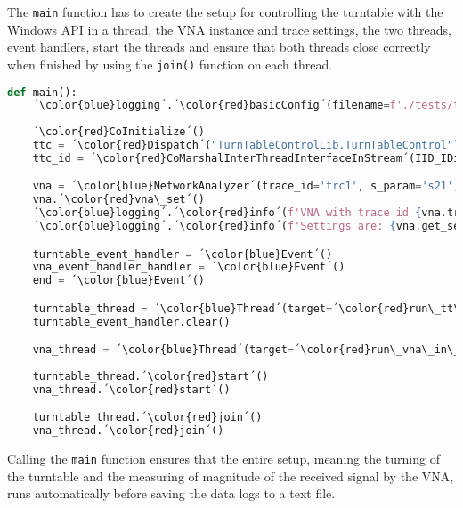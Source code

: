 The \verb+main+ function has to create the setup for controlling the turntable with the Windows API in a thread, the VNA instance and trace settings, the two threads, event handlers, start the threads and ensure that both threads close correctly when finished by using the \verb+join()+ function on each thread. 
\begin{lstlisting}[language=Python, caption=Main function.]
def main():
    ´\color{blue}logging´.´\color{red}basicConfig´(filename=f'./tests/test-{time.strftime("%Y%m%d-%H%M")}-log.txt', filemode='a', format="%(asctime)s:%(name)s: %(message)s", level=logging.INFO, datefmt="%Y-%m-%d %H:%M:%S")
    
    ´\color{red}CoInitialize´()
    ttc = ´\color{red}Dispatch´("TurnTableControlLib.TurnTableControl")
    ttc_id = ´\color{red}CoMarshalInterThreadInterfaceInStream´(IID_IDispatch, ttc)

    vna = ´\color{blue}NetworkAnalyzer´(trace_id='trc1', s_param='s21', freq=5.65)
    vna.´\color{red}vna\_set´()
    ´\color{blue}logging´.´\color{red}info´(f'VNA with trace id {vna.trace_id} is created. Measuring {vna.s_param}.')
    ´\color{blue}logging´.´\color{red}info´(f'Settings are: {vna.get_settings()}')

    turntable_event_handler = ´\color{blue}Event´()
    vna_event_handler_handler = ´\color{blue}Event´()
    end = ´\color{blue}Event´()

    turntable_thread = ´\color{blue}Thread´(target=´\color{red}run\_tt\_in\_thread´, kwargs={'ttc_id': ttc_id, 'ttc': ttc, 'turntable_event_handler': turntable_event_handler, 'vna_event_handler': vna_event_handler_handler, 'end': end})
    turntable_event_handler.clear()

    vna_thread = ´\color{blue}Thread´(target=´\color{red}run\_vna\_in\_thread´, kwargs={'vna': vna, 'turntable_event_handler': turntable_event_handler, 'vna_event_handler': vna_event_handler_handler, 'end': end})
    
    turntable_thread.´\color{red}start´()
    vna_thread.´\color{red}start´()

    turntable_thread.´\color{red}join´()
    vna_thread.´\color{red}join´()
\end{lstlisting}
Calling the \verb+main+ function ensures that the entire setup, meaning the turning of the turntable and the measuring of magnitude of the received signal by the VNA, runs automatically before saving the data logs to a text file.